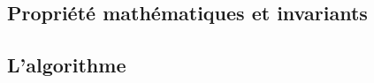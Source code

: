 \subsection{Propriété mathématiques et invariants}
\label{subsec:theorie_prob_prop_math_invariant}

\subsection{L'algorithme}
\label{subsec:theorie_prob_algo}



